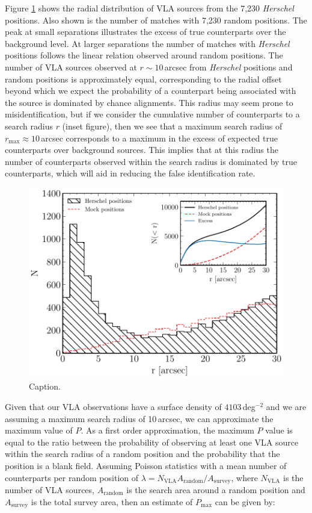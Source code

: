 Figure \ref{fig:optimal_radius} shows the radial distribution of VLA sources from the 7,230 \textit{Herschel} positions. Also shown is the number of matches with 7,230 random positions. The peak at small separations illustrates the excess of true counterparts over the background level. At larger separations the number of matches with \textit{Herschel} positions follows the linear relation observed around random positions. The number of VLA sources observed at $r \sim 10$\,arcsec from \textit{Herschel} positions and random positions is approximately equal, corresponding to the radial offset beyond which we expect the probability of a counterpart being associated with the source is dominated by chance alignments. This radius may seem prone to misidentification, but if we consider the cumulative number of counterparts to a search radius $r$ (inset figure), then we see that a maximum search radius of $r_{\textrm{max}} \approx 10$\,arcsec corresponds to a maximum in the excess of expected true counterparts over background sources. This implies that at this radius the number of counterparts observed within the search radius is dominated by true counterparts, which will aid in reducing the false identification rate.

\begin{figure}
	\centering
	\includegraphics[width=0.75\columnwidth]{Figures/optimal_radius.pdf}
	\caption{{\color{red} Caption.}}
	\label{fig:optimal_radius}
\end{figure}

Given that our VLA observations have a surface density of $4103\,$deg$^{-2}$ and we are assuming a maximum search radius of 10\,arcsec, we can approximate the maximum value of $P$. As a first order approximation, the maximum $P$ value is equal to the ratio between the probability of observing at least one VLA source within the search radius of a random position and the probability that the position is a blank field. Assuming Poisson statistics with a mean number of counterparts per random position of $\lambda = N_{\textrm{VLA}}A_{\textrm{random}}/A_{\textrm{survey}}$, where $N_{\textrm{VLA}}$ is the number of VLA sources, $A_{\textrm{random}}$ is the search area around a random position and $A_{\textrm{survey}}$ is the total survey area, then an estimate of $P_{\textrm{max}}$ can be given by:

